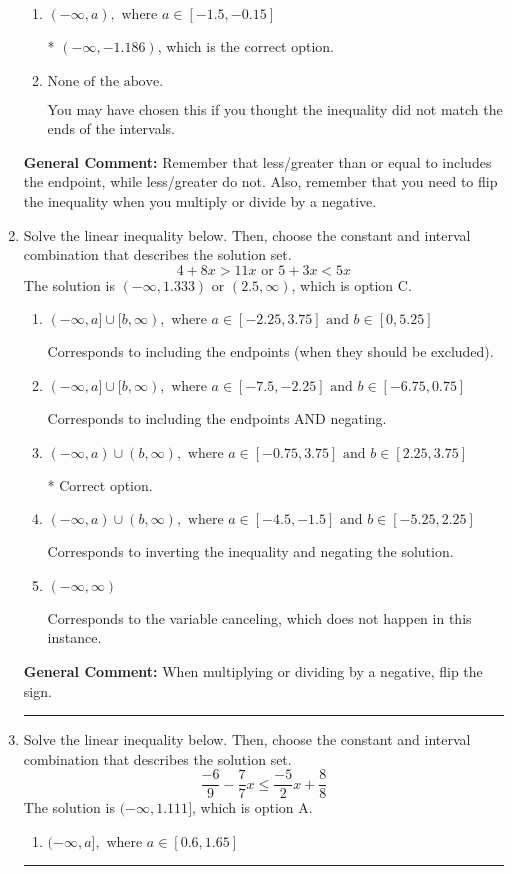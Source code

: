 \documentclass{extbook}[14pt]
\newcommand{\litem}[1]{\item #1

\rule{\textwidth}{0.4pt}}
\begin{document}
\begin{enumerate}
{\begin{enumerate}[label=\Alph*.]
 $(-\infty, 1.186)$, which corresponds to negating the endpoint of the solution.
\item \( (-\infty, a), \text{ where } a \in [-1.5, -0.15] \)

* $(-\infty, -1.186)$, which is the correct option.
\item \( \text{None of the above}. \)

You may have chosen this if you thought the inequality did not match the ends of the intervals.
\end{enumerate}

\textbf{General Comment:} Remember that less/greater than or equal to includes the endpoint, while less/greater do not. Also, remember that you need to flip the inequality when you multiply or divide by a negative.
}
\litem{
Solve the linear inequality below. Then, choose the constant and interval combination that describes the solution set.
\[ 4 + 8 x > 11 x \text{ or } 5 + 3 x < 5 x \]The solution is \( (-\infty, 1.333) \text{ or } (2.5, \infty) \), which is option C.\begin{enumerate}[label=\Alph*.]
\item \( (-\infty, a] \cup [b, \infty), \text{ where } a \in [-2.25, 3.75] \text{ and } b \in [0, 5.25] \)

Corresponds to including the endpoints (when they should be excluded).
\item \( (-\infty, a] \cup [b, \infty), \text{ where } a \in [-7.5, -2.25] \text{ and } b \in [-6.75, 0.75] \)

Corresponds to including the endpoints AND negating.
\item \( (-\infty, a) \cup (b, \infty), \text{ where } a \in [-0.75, 3.75] \text{ and } b \in [2.25, 3.75] \)

 * Correct option.
\item \( (-\infty, a) \cup (b, \infty), \text{ where } a \in [-4.5, -1.5] \text{ and } b \in [-5.25, 2.25] \)

Corresponds to inverting the inequality and negating the solution.
\item \( (-\infty, \infty) \)

Corresponds to the variable canceling, which does not happen in this instance.
\end{enumerate}

\textbf{General Comment:} When multiplying or dividing by a negative, flip the sign.
}
\litem{
Solve the linear inequality below. Then, choose the constant and interval combination that describes the solution set.
\[ \frac{-6}{9} - \frac{7}{7} x \leq \frac{-5}{2} x + \frac{8}{8} \]The solution is \( (-\infty, 1.111] \), which is option A.\begin{enumerate}[label=\Alph*.]
\item \( (-\infty, a], \text{ where } a \in [0.6, 1.65] \)


\end{enumerate}}
\end{enumerate}
\end{document}
